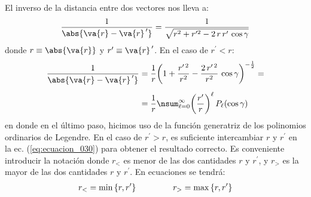 El inverso de la distancia entre dos vectores nos lleva a:
\begin{align}
\dfrac{1}{\abs{\va{r} - \va{r}^{\, \prime}}} = \dfrac{1}{\sqrt{r^{2} + r^{\prime 2} - 2 \, r \, r^{\prime} \, \cos \gamma}}
\label{eq:ecuacion_029}
\end{align}
donde $r \equiv \abs{\va{r}}$ y $r^{\prime} \equiv \va{r}^{\, \prime}$. En el caso de $r^{\prime} < r$:
\begin{align}
\begin{aligned}[b]
\dfrac{1}{\abs{\va{r} - \va{r}^{\, \prime}}} &= \dfrac{1}{r} \bigg( 1 + \dfrac{r^{\prime \, 2}}{r^{2}} - \dfrac{2 \, r^{\prime \, 2}}{r^{2}} \, \cos \gamma \bigg)^{-\frac{1}{2}} = \\[0.5em]
&= \dfrac{1}{r} \nsum_{\ell=0}^{\infty} \bigg( \dfrac{r^{\prime}}{r} \bigg)^{\ell} \, P_{\ell} (\cos \gamma)
\end{aligned}
\label{eq:ecuacion_030}
\end{align}
en donde en el último paso, hicimos uso de la función generatriz de los polinomios ordinarios de Legendre. En el caso de $r^\prime > r$, es suficiente intercambiar $r$ y $r^{\prime}$ en la ec. (\ref{eq:ecuacion_030}) para obtener el resultado correcto. Es conveniente introducir la notación donde $r_{<}$ es menor de las dos cantidades $r$ y $r^{\prime}$, y $r_{>}$ es la mayor de las dos cantidades $r$ y $r^{\prime}$. En ecuaciones se tendrá:
\begin{align*}
r_{<} = \min \left\{ r, r^{\prime} \right\} \hspace{1.5cm} r_{>} = \max \left\{ r, r^{\prime} \right\}
\end{align*}

